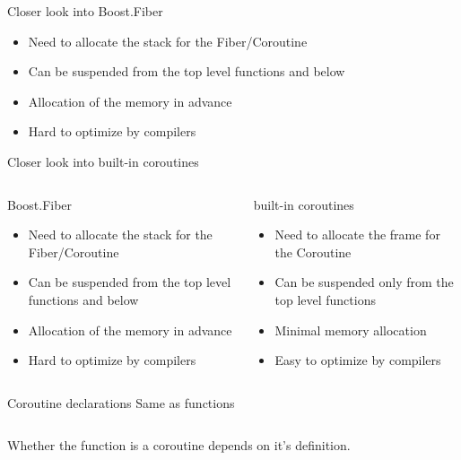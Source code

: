\documentclass[10pt]{beamer}
\begin{document}
\begin{frame}{Closer look into Boost.Fiber}
  \begin{itemize}[<+- |alert@+>]
  \item Need to allocate the stack for the Fiber/Coroutine
  \item Can be suspended from the top level functions and below
  \item Allocation of the memory in advance
  \item Hard to optimize by compilers
  \end{itemize}
\end{frame}

\begin{frame}{Closer look into built-in coroutines}

  \begin{columns}[t]
  \begin{column}{0.48\linewidth}
  \centerline{Boost.Fiber}
  \vfill
  \begin{itemize}
  \item Need to allocate the stack for the Fiber/Coroutine
  \item Can be suspended from the top level functions and below
  \item Allocation of the memory in advance
  \item Hard to optimize by compilers
  \end{itemize}
  \end{column}
  \begin{column}{0.48\linewidth}
  \centerline{\alert{built-in coroutines}}
  \vfill
  \begin{itemize}[<+- |alert@+>]
  \item Need to allocate the frame for the Coroutine
  \item Can be suspended only from the top level functions
  \item Minimal memory allocation
  \item Easy to optimize by compilers
  \end{itemize}
  \end{column}
  
  \end{columns}
  
\end{frame}

\begin{frame}[fragile]{Coroutine declarations}
  \centering Same as functions

  \vfill
  \begin{center}
  \begin{minipage}{0.7\linewidth}
  \inputminted{c++}{code-examples/intro/declaration.hpp}
  \end{minipage}
  \end{center}
  \vfill

  Whether the function is a coroutine depends on \alert{it's definition}.

\end{frame}
\end{document}
